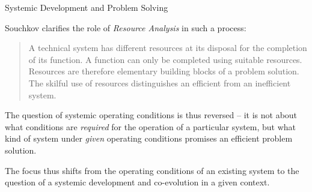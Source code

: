 \documentclass{beamer}
\begin{document}
\begin{frame}{Systemic Development and Problem Solving}
  
Souchkov clarifies the role of \emph{Resource Analysis} in such a process:
\begin{quote}\small
  A technical system has different resources at its disposal for the
  completion of its function. A function can only be completed using suitable
  resources. Resources are therefore elementary building blocks of a problem
  solution. The skilful use of resources distinguishes an efficient from an
  inefficient system.
\end{quote}

The question of systemic operating conditions is thus reversed -- it is not
about what conditions are \emph{required} for the operation of a particular
system, but what kind of system under \emph{given} operating conditions
promises an efficient problem solution.

The focus thus shifts from the operating conditions of an existing system to
the question of a systemic development and co-evolution in a given context.

\end{frame}
\end{document}
